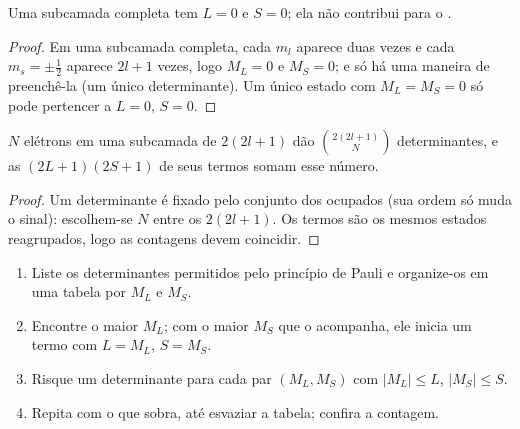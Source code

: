 \begin{proposition}\label{prop:b3:many-electron-atoms:closed-shell}
Uma subcamada completa tem $L = 0$ e $S = 0$; ela não contribui para o
.
\end{proposition}

\begin{proof}
Em uma subcamada completa, cada $m_l$ aparece duas vezes e cada $m_s = \pm\frac12$
aparece $2l+1$ vezes, logo $M_L = 0$ e $M_S = 0$; e só há uma maneira de
preenchê-la (um único determinante). Um único estado com $M_L = M_S = 0$ só pode
pertencer a $L = 0$, $S = 0$.
\end{proof}

\begin{proposition}\label{prop:b3:many-electron-atoms:count}
$N$ elétrons em uma subcamada de $2(2l+1)$  dão
$\binom{2(2l+1)}{N}$ determinantes, e as  $(2L+1)(2S+1)$ de
seus termos somam esse número.
\end{proposition}

\begin{proof}
Um determinante é fixado pelo conjunto dos  ocupados (sua ordem
só muda o sinal): escolhem-se $N$ entre os $2(2l+1)$. Os termos são os
mesmos estados reagrupados, logo as contagens devem coincidir.
\end{proof}

\begin{method}\label{met:b3:many-electron-atoms:terms}
\begin{enumerate}
  \item Liste os determinantes permitidos pelo princípio de Pauli e
        organize-os em uma tabela por $M_L$ e $M_S$.
  \item Encontre o maior $M_L$; com o maior $M_S$ que o acompanha, ele
        inicia um termo com $L = M_L$, $S = M_S$.
  \item Risque um determinante para cada par $(M_L, M_S)$ com
        $|M_L| \le L$, $|M_S| \le S$.
  \item Repita com o que sobra, até esvaziar a tabela; confira a contagem.
\end{enumerate}
\end{method}

